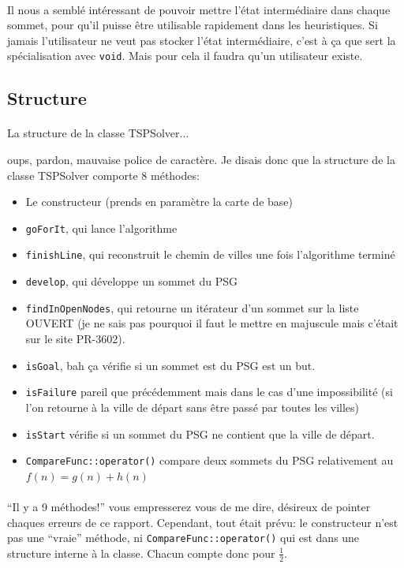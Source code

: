 \documentclass[french]{article}
\begin{document}
\paragraph{} Il nous a semblé intéressant de pouvoir mettre l'état
intermédiaire dans chaque sommet, pour qu'il puisse être utilisable rapidement
dans les heuristiques. Si jamais l'utilisateur ne veut pas stocker l'état
intermédiaire, c'est à ça que sert la spécialisation avec
\texttt{void}. Mais pour cela il faudra qu'un utilisateur existe.

\subsection{Structure}

{ \paragraph{} La structure de la classe TSPSolver...}
oups, pardon, mauvaise police de caractère. Je disais donc que la structure de
la classe TSPSolver comporte 8 méthodes:

\begin{itemize}
	\item Le constructeur (prends en paramètre la carte de base)
	\item \texttt{goForIt}, qui lance l'algorithme
	\item \texttt{finishLine}, qui reconstruit le chemin de villes une fois
		l'algorithme terminé
	\item \texttt{develop}, qui développe un sommet du PSG
	\item \texttt{findInOpenNodes}, qui retourne un itérateur d'un sommet sur
		la liste OUVERT (je ne sais pas pourquoi il faut le mettre en majuscule
		mais c'était sur le site PR-3602).
	\item \texttt{isGoal}, bah ça vérifie si un sommet est du PSG est un but.
	\item \texttt{isFailure} pareil que précédemment mais dans le cas d'une
		impossibilité (si l'on retourne à la ville de départ sans être passé
		par toutes les villes)
	\item \texttt{isStart} vérifie si un sommet du PSG ne contient que la ville
		de départ.
	\item \texttt{CompareFunc::operator()} compare deux sommets du PSG
		relativement au $f(n) = g(n) + h(n)$
\end{itemize}

\paragraph{} ``Il y a 9 méthodes!'' vous empresserez vous de me dire, désireux
de pointer chaques erreurs de ce rapport. Cependant, tout était prévu: le
constructeur n'est pas une ``vraie'' méthode, ni
\texttt{CompareFunc::operator()} qui est dans une structure interne à
la classe. Chacun compte donc pour $\frac{1}{2}$.
\end{document}
